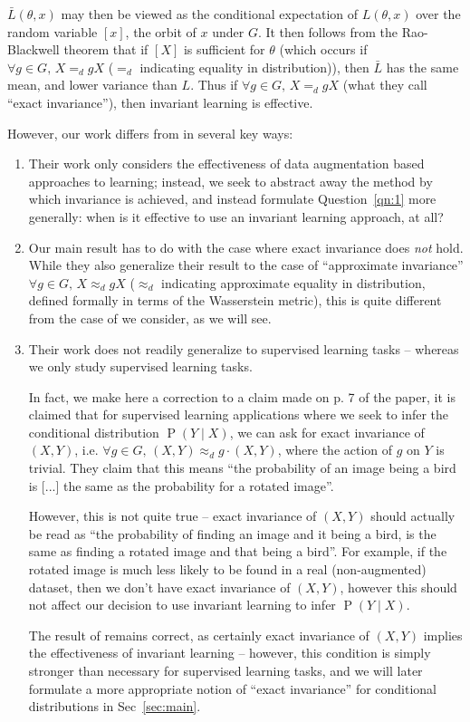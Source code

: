 \documentclass[12pt]{article}
\newcommand{\Prob}[1]{\operatorname{P}\left(#1\right)}
\theoremstyle{definition}
\numberwithin{equation}{section}
\numberwithin{figure}{section}
\numberwithin{table}{section}
\begin{document}
$\bar L(\theta, x)$ may then be viewed as the conditional expectation of $L(\theta, x)$ over the random variable $[x]$, the orbit of $x$ under $G$. It then follows from the Rao-Blackwell theorem that if $[X]$ is sufficient for $\theta$ (which occurs if $\forall g\in G, \, X =_d gX$ ($=_d$ indicating equality in distribution)), then $\bar{L}$ has the same mean, and lower variance than $L$. Thus if $\forall g\in G, \, X =_d gX$ (what they call ``exact invariance''), then invariant learning is effective. 

However, our work differs from \cite{sxchen} in several key ways:

\begin{enumerate}
    \item Their work only considers the effectiveness of data augmentation based approaches to learning; instead, we seek to abstract away the method by which invariance is achieved, and instead formulate Question~\ref{qn:1} more generally: when is it effective to use an invariant learning approach, at all?
    \item Our main result has to do with the case where exact invariance does \emph{not} hold. While they also generalize their result to the case of ``approximate invariance'' $\forall g\in G, \, X \approx_d gX$ ($\approx_d$ indicating approximate equality in distribution, defined formally in terms of the Wasserstein metric), this is quite different from the case of we consider, as we will see. 
    \item Their work does not readily generalize to supervised learning tasks -- whereas we only study supervised learning tasks.
    
    In fact, we make here a correction to a claim made on p. 7 of the paper, it is claimed that for supervised learning applications where we seek to infer the conditional distribution $\Prob{Y\mid X}$, we can ask for exact invariance of $(X, Y)$, i.e. $\forall g\in G, \, (X, Y) \approx_d g\cdot (X, Y)$, where the action of $g$ on $Y$ is trivial. They claim that this means ``the probability of an image being a bird is [...] the same as the probability for a rotated image''.
    
    However, this is not quite true -- exact invariance of $(X, Y)$ should actually be read as ``the probability of finding an image and it being a bird, is the same as finding a rotated image and that being a bird''. For example, if the rotated image is much less likely to be found in a real (non-augmented) dataset, then we don't have exact invariance of $(X, Y)$, however this should not affect our decision to use invariant learning to infer $\Prob{Y\mid X}$. 
    
    The result of \cite{sxchen} remains correct, as certainly exact invariance of $(X, Y)$ implies the effectiveness of invariant learning -- however, this condition is simply stronger than necessary for supervised learning tasks, and we will later formulate a more appropriate notion of ``exact invariance'' for conditional distributions in Sec~\ref{sec:main}.
\end{enumerate}
\end{document}
